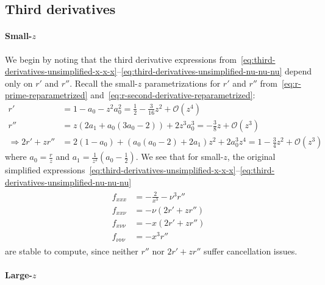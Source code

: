 \documentclass{article}
\begin{document}
\subsection{Third derivatives}

\paragraph{Small-$z$}

We begin by noting that the third derivative expressions from~\eqref{eq:third-derivatives-unsimplified-x-x-x}--\eqref{eq:third-derivatives-unsimplified-nu-nu-nu} depend only on $r'$ and $r''$.
Recall the small-$z$ parametrizations for $r'$ and $r''$ from~\eqref{eq:r-prime-reparametrized} and~\eqref{eq:r-second-derivative-reparametrized}:
%
\begin{align}
  r'                      & = 1 - a_0 - z^2 a_0^2 = \frac{1}{2} - \frac{3}{16}z^2 + \mathcal{O}(z^4)                          \\
  r''                     & = z (2a_1 + a_0 (3 a_0 - 2)) + 2 z^3 a_0^3 = -\frac{3}{8}z + \mathcal{O}(z^3)                     \\
  \Rightarrow 2r' + z r'' & = 2 (1 - a_0) + (a_0 (a_0 - 2) + 2 a_1) z^2 + 2 a_0^3 z^4 = 1 - \frac{3}{4}z^2 + \mathcal{O}(z^3)
\end{align}
%
where $a_0 = \frac{r}{z}$ and $a_1 = \frac{1}{z^2} (a_0 - \frac{1}{2})$.
We see that for small-$z$, the original simplified expressions~\eqref{eq:third-derivatives-unsimplified-x-x-x}--\eqref{eq:third-derivatives-unsimplified-nu-nu-nu}
%
\begin{align}
  \boxed{
    \begin{aligned}
      f_{xxx}       & = -\frac{2}{x^3} - \nu^3 r'' \\
      f_{xx\nu}     & = -\nu(2r' + z r'')          \\
      f_{x\nu\nu}   & = -x(2r' + z r'')            \\
      f_{\nu\nu\nu} & = -x^3 r''
    \end{aligned}
  }
\end{align}
%
are stable to compute, since neither $r''$ nor $2r' + z r''$ suffer cancellation issues.

\paragraph{Large-$z$}
\end{document}
